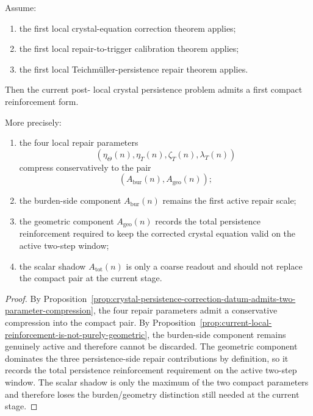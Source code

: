 \begin{theorem}
\label{thm:first-compact-reinforcement-theorem}
Assume:
\begin{enumerate}[leftmargin=2em,label=(\alph*)]
 \item the first local crystal-equation correction theorem applies;
 \item the first local repair-to-trigger calibration theorem applies;
 \item the first local Teichmüller-persistence repair theorem applies.
\end{enumerate}
Then the current post- local crystal persistence problem admits a first compact reinforcement form.

More precisely:
\begin{enumerate}[leftmargin=2em,label=(\arabic*)]
 \item the four local repair parameters
 \[
 (\eta_{\Theta}(n),\eta_T(n),\zeta_T(n),\lambda_T(n))
 \]
 compress conservatively to the pair
 \[
 (A_{\mathrm{bur}}(n),A_{\mathrm{geo}}(n));
 \]
 \item the burden-side component $A_{\mathrm{bur}}(n)$ remains the first active repair scale;
 \item the geometric component $A_{\mathrm{geo}}(n)$ records the total persistence reinforcement required to keep the corrected crystal equation valid on the active two-step window;
 \item the scalar shadow $A_{\mathrm{tot}}(n)$ is only a coarse readout and should not replace the compact pair at the current stage.
\end{enumerate}
\end{theorem}

\begin{proof}
By Proposition~\ref{prop:crystal-persistence-correction-datum-admits-two-parameter-compression}, the four repair parameters admit a conservative compression into the compact pair.
By Proposition~\ref{prop:current-local-reinforcement-is-not-purely-geometric}, the burden-side component remains genuinely active and therefore cannot be discarded.
The geometric component dominates the three persistence-side repair contributions by definition, so it records the total persistence reinforcement requirement on the active two-step window.
The scalar shadow is only the maximum of the two compact parameters and therefore loses the burden/geometry distinction still needed at the current stage.
\end{proof}

